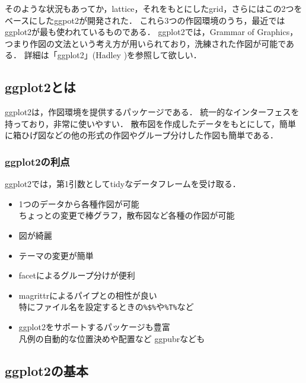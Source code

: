 \documentclass[
]{article}
\providecommand{\tightlist}{%
  \setlength{\itemsep}{0pt}\setlength{\parskip}{0pt}}
\begin{document}
そのような状況もあってか，lattice，それをもとにしたgrid，さらにはこの2つをベースにしたggpot2が開発された．
これら3つの作図環境のうち，最近ではggplot2が最も使われているものである．
ggplot2では，Grammar of Graphics，つまり作図の文法という考え方が用いられており，洗練された作図が可能である．
詳細は「ggplot2」(Hadley )を参照して欲しい．

\hypertarget{ggplot2ux3068ux306f}{%
\subsection{ggplot2とは}\label{ggplot2ux3068ux306f}}

ggplot2は，作図環境を提供するパッケージである．
統一的なインターフェスを持っており，非常に使いやすい．
散布図を作成したデータをもとにして，簡単に箱ひげ図などの他の形式の作図やグループ分けした作図も簡単である．

\hypertarget{ggplot2ux306eux5229ux70b9}{%
\subsubsection{ggplot2の利点}\label{ggplot2ux306eux5229ux70b9}}

ggplot2では，第1引数としてtidyなデータフレームを受け取る．

\begin{itemize}
\tightlist
\item
  1つのデータから各種作図が可能\\
  ちょっとの変更で棒グラフ，散布図など各種の作図が可能\\
\item
  図が綺麗\\
\item
  テーマの変更が簡単\\
\item
  facetによるグループ分けが便利\\
\item
  magrittrによるパイプとの相性が良い\\
  特にファイル名を設定するときの\texttt{\%\$\%}や\texttt{\%T\%}など\\
\item
  ggplot2をサポートするパッケージも豊富\\
  凡例の自動的な位置決めや配置など
  ggpubrなども
\end{itemize}

\hypertarget{ggplot2ux306eux57faux672c}{%
\subsection{ggplot2の基本}\label{ggplot2ux306eux57faux672c}}
\end{document}
